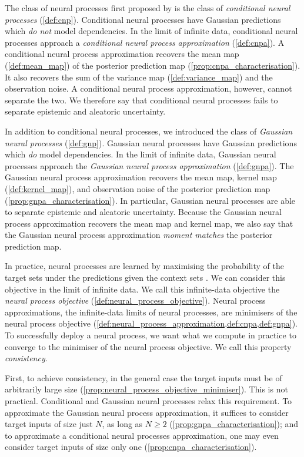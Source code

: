 \documentclass[12pt, twoside]{report}
\begin{document}
The class of neural processes first proposed by \textcite{Garnelo:2018:Conditional_Neural_Processes} is the class of \emph{conditional neural processes} (\cref{def:cnp}).
Conditional neural processes have Gaussian predictions which \emph{do not} model dependencies.
In the limit of infinite data, conditional neural processes approach a \emph{conditional neural process approximation} (\cref{def:cnpa}).
A conditional neural process approximation recovers the mean map (\cref{def:mean_map}) of the posterior prediction map (\cref{prop:cnpa_characterisation}).
It also recovers the sum of the variance map (\cref{def:variance_map}) and the observation noise.
A conditional neural process approximation, however, cannot separate the two.
We therefore say that conditional neural processes fails to separate epistemic and aleatoric uncertainty.

In addition to conditional neural processes, we introduced the class of \emph{Gaussian neural processes} (\cref{def:gnp}).
Gaussian neural processes have Gaussian predictions which \emph{do} model dependencies.
In the limit of infinite data, Gaussian neural processes approach the \emph{Gaussian neural process approximation} (\cref{def:gnpa}).
The Gaussian neural process approximation recovers the mean map, kernel map (\cref{def:kernel_map}), and observation noise of the posterior prediction map (\cref{prop:gnpa_characterisation}).
In particular, Gaussian neural processes are able to separate epistemic and aleatoric uncertainty.
Because the Gaussian neural process approximation recovers the mean map and kernel map, we also say that the Gaussian neural process approximation \emph{moment matches} the posterior prediction map.

In practice, neural processes are learned by maximising the probability of the target sets under the predictions given the context sets \parencite{Garnelo:2018:Neural_Processes}.
We can consider this objective in the limit of infinite data.
We call this infinite-data objective the \emph{neural process objective} (\cref{def:neural_process_objective}).
Neural process approximations, the infinite-data limits of neural processes, are minimisers of the neural process objective (\cref{def:neural_process_approximation,def:cnpa,def:gnpa}).
To successfully deploy a neural process, we want what we compute in practice to converge to the minimiser of the neural process objective.
We call this property \emph{consistency}.

First, to achieve consistency, in the general case the target inputs must be of arbitrarily large size (\cref{prop:neural_process_objective_minimiser}).
This is not practical.
Conditional and Gaussian neural processes relax this requirement.
To approximate the Gaussian neural process approximation, it suffices to consider target inputs of size just $N$, as long as $N \ge 2$ (\cref{prop:gnpa_characterisation});
and to approximate a conditional neural processes approximation, one may even consider target inputs of size only one (\cref{prop:cnpa_characterisation}).
\end{document}
